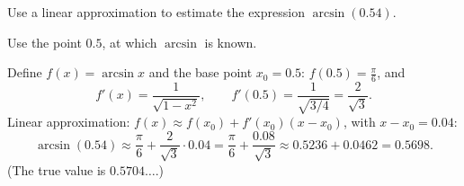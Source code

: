 
\begin{question}
Use a linear approximation to estimate the expression $\arcsin(0.54)$.
\end{question}

\begin{hint}
Use the point $0.5$, at which $\arcsin$ is known.
\end{hint}

\begin{solution}
Define $f(x)=\arcsin x$ and the base point $x_0=0.5$: $f(0.5)=\frac{\pi}{6}$, and
\[ f'(x)=\frac{1}{\sqrt{1-x^2}},\qquad f'(0.5)=\frac{1}{\sqrt{3/4}}=\frac{2}{\sqrt3}. \]
Linear approximation: $f(x)\approx f(x_0)+f'(x_0)(x-x_0)$, with $x-x_0=0.04$:
\[ \arcsin(0.54)\approx\frac{\pi}{6}+\frac{2}{\sqrt3}\cdot0.04=\frac{\pi}{6}+\frac{0.08}{\sqrt3}\approx 0.5236+0.0462=0.5698. \]
(The true value is $0.5704\ldots$.)
\end{solution}
